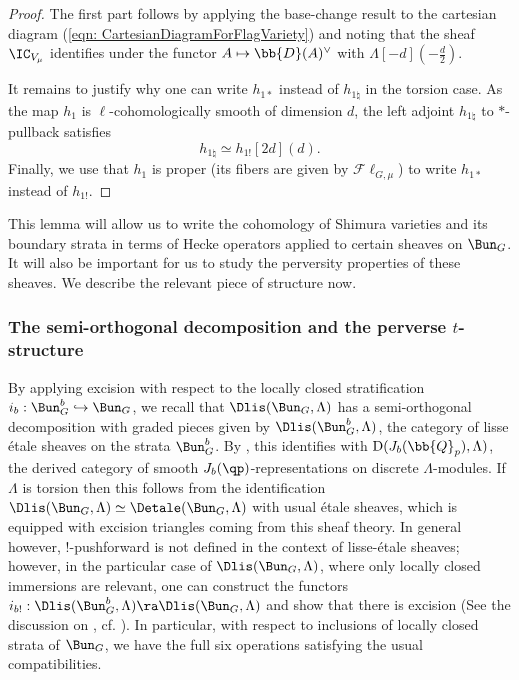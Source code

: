 \documentclass[letterpaper,11pt]{amsart}
\begin{document}
\begin{proof}
The first part follows by applying the base-change result \cite[Proposition~VII.3.1 (iii)]{FSGeomLLC} to the cartesian diagram (\ref{eqn: CartesianDiagramForFlagVariety}) and noting that the sheaf $\IC_{V_{\mu}}$ identifies under the functor $A\mapsto \bb{D}(A)^\vee$ with $\Lambda[-d](-\frac{d}{2})$.

It remains to justify why one can write $h_{1*}$ instead of $h_{1\natural}$ in the torsion case. As the map $h_1$ is $\ell$-cohomologically smooth of dimension $d$, the left adjoint $h_{1\natural}$  to $*$-pullback satisfies 
\[h_{1\natural}\simeq h_{1!}[2d](d).\] Finally, we use that $h_1$ is proper (its fibers are given by $\mathcal{F}\ell_{G,\mu}$) to write $h_{1*}$ instead of $h_{1!}$. 
\end{proof}

\noindent This lemma will allow us to write the cohomology of Shimura varieties and its boundary strata in terms of Hecke operators applied to certain sheaves on $\Bun_{G}$. It will also be important for us to study the perversity properties of these sheaves. We describe the relevant piece of structure now. 

\subsubsection{The semi-orthogonal decomposition and the perverse $t$-structure}{\label{s: SemiOrthogonalDecompositionPerverseTStruture}}
By applying excision with respect to the locally closed stratification $i_{b}: \Bun_{G}^{b} \hookrightarrow \Bun_{G}$, we recall that $\Dlis(\Bun_{G},\Lambda)$ has a semi-orthogonal decomposition with graded pieces given by $\Dlis(\Bun_{G}^{b},\Lambda)$, the category of lisse \'etale sheaves on the strata $\Bun_{G}^{b}$. By \cite[Proposition~VII.7.1]{FSGeomLLC}, this identifies with $\mathrm{D}(J_{b}(\bb{Q}_{p}),\Lambda)$, the derived category of smooth $J_b(\qp)$-representations on discrete $\Lambda$-modules. If $\Lambda$ is torsion then this follows from the identification $\Dlis(\Bun_{G},\Lambda) \simeq \Detale(\Bun_{G},\Lambda)$  with usual \'etale sheaves, which is equipped with excision triangles coming from this sheaf theory. In general however, $!$-pushforward is not defined in the context of lisse-\'etale sheaves; however, in the particular case of $\Dlis(\Bun_{G},\Lambda)$, where only locally closed immersions are relevant, one can construct the functors $i_{b!}: \Dlis(\Bun_{G}^{b},\Lambda) \ra \Dlis(\Bun_{G},\Lambda)$ and show that there is excision (See the discussion on \cite[Page~11-12]{ImaConv}, cf. \cite[Proposition VII.6.7]{FSGeomLLC}). In particular, with respect to inclusions of locally closed strata of $\Bun_{G}$, we have the full six operations satisfying the usual compatibilities.
\end{document}
